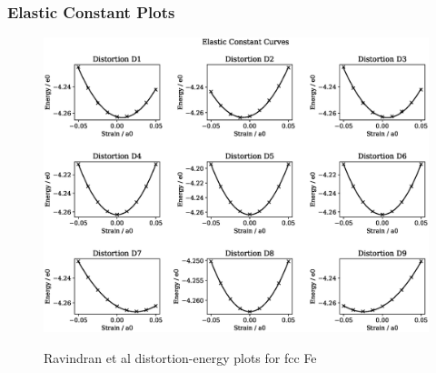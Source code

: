 \clearpage
\subsubsection{Elastic Constant Plots}

\begin{figure}[htb]
\centering
\includegraphics[width=.90\linewidth]{chapters/potentials_fe_pd_ru/fepd_potential/ec_rfkj/elastic_strains_bp_1.eps}  
\label{fig:fepd-fefcc-distortions}
\caption{Ravindran et al\cite{dfttisiravindran} distortion-energy plots for \acrshort{fcc} Fe}
\end{figure}

